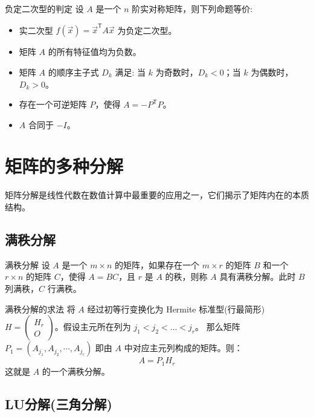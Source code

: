 \documentclass[a4paper,12pt]{ctexart}
\begin{document}
\begin{mythm}{负定二次型的判定}{}
    设 $A$ 是一个 $n$ 阶实对称矩阵，则下列命题等价:
    \begin{itemize}
        \item 实二次型 $f(\vec{x}) = \vec{x}^{\mathsf{T}} A \vec{x}$ 为负定二次型。
        \item 矩阵 $A$ 的所有特征值均为负数。
        \item 矩阵 $A$ 的顺序主子式 $D_k$ 满足: 当 $k$ 为奇数时，$D_k < 0$；当 $k$ 为偶数时，$D_k > 0$。
        \item 存在一个可逆矩阵 $P$，使得 $A = - P^{\mathsf{T}} P$。
        \item $A$ 合同于 $-I$。
    \end{itemize}
\end{mythm}

\newpage

\section{矩阵的多种分解}

矩阵分解是线性代数在数值计算中最重要的应用之一，它们揭示了矩阵内在的本质结构。

\subsection{满秩分解}

\begin{mydef}{满秩分解}{}
设 $A$ 是一个 $m \times n$ 的矩阵，如果存在一个 $m \times r$ 的矩阵 $B$ 和一个 $r \times n$ 的矩阵 $C$，使得 $A = BC$，且 $r$ 是 $A$ 的秩，则称 $A$ 具有满秩分解。此时 $B$ 列满秩，$C$ 行满秩。
\end{mydef}

\begin{mythm}{满秩分解的求法}{}
将 $A$ 经过初等行变换化为 Hermite 标准型(行最简形) $H = \begin{pmatrix} H_r \\ O \end{pmatrix}$。假设主元所在列为 $j_1 < j_2 < \dots < j_r$。
那么矩阵 $P_1 = (A_{j_1}, A_{j_2}, \cdots, A_{j_r})$ 即由 $A$ 中对应主元列构成的矩阵。则：
\[ A = P_1 H_r \]
这就是 $A$ 的一个满秩分解。
\end{mythm}

\subsection{LU分解(三角分解)}
\end{document}
